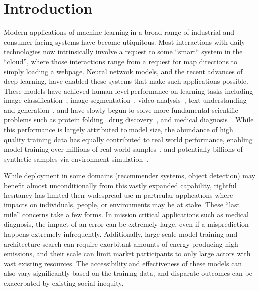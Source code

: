 \chapter{Introduction} \label{chap:intro} 

Modern applications of machine learning in a broad range of industrial and consumer-facing systems have become ubiquitous.
Most interactions with daily technologies now intrinsically involve 
a request to some ``smart`` system in the ``cloud'', 
where those interactions range from
a request for map directions 
to simply loading a webpage.
Neural network models, and the recent advances of deep learning,
have enabled these systems that 
make such applications possible.
These models have achieved
human-level performance on learning tasks
including image classification~\citep{resnet,alexnet}, image segmentation~\citep{segmentation}, video analysis~\citep{zhang2016video}, text understanding and generation~\citep{bert,gpt}, and have slowly begun to solve more fundamental scientific problems such as protein folding~\citep{protein} drug discovery~\citep{drugdisc}, and medical diagnosis~\citep{diag}.
While this performance is largely attributed to model size,
the abundance of high quality training data
has equally contributed to real world performance,
enabling model training over millions of real world samples~\citep{imagenet,laion},
and potentially billions of synthetic samples via environment simulation~\citep{mcts}.

While deployment in some domains (recommender systems, object detection) may benefit almost unconditionally from this vastly expanded capability, rightful hesitancy has limited their widespread use in particular applications where impacts on individuals, people, or environments may be at stake.
These ``last mile'' concerns take a few forms.
In mission critical applications such as medical diagnosis, 
the impact of an error can be extremely large,
even if a misprediction happens extremely infrequently.
Additionally, large scale model training and architecture search
can require exorbitant amounts of energy producing high emissions,
and their scale can limit market participants
to only large actors with vast existing resources.
The accessibility and effectiveness of these models can also vary significantly based on the training data, and disparate outcomes can be exacerbated by existing social inequity.

